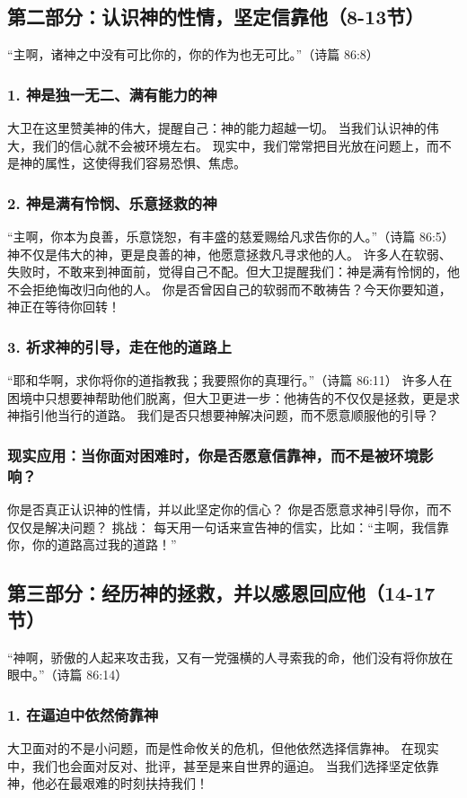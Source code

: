 \documentclass[a4paper, 12pt]{article}
\begin{document}
\subsection*{第二部分：认识神的性情，坚定信靠他（8-13节）}
“主啊，诸神之中没有可比你的，你的作为也无可比。”（诗篇 86:8）
\subsubsection*{1. 神是独一无二、满有能力的神}
大卫在这里赞美神的伟大，提醒自己：神的能力超越一切。
当我们认识神的伟大，我们的信心就不会被环境左右。
现实中，我们常常把目光放在问题上，而不是神的属性，这使得我们容易恐惧、焦虑。
\subsubsection*{2. 神是满有怜悯、乐意拯救的神}
“主啊，你本为良善，乐意饶恕，有丰盛的慈爱赐给凡求告你的人。”（诗篇 86:5）
神不仅是伟大的神，更是良善的神，他愿意拯救凡寻求他的人。
许多人在软弱、失败时，不敢来到神面前，觉得自己不配。但大卫提醒我们：神是满有怜悯的，他不会拒绝悔改归向他的人。
你是否曾因自己的软弱而不敢祷告？今天你要知道，神正在等待你回转！
\subsubsection*{3. 祈求神的引导，走在他的道路上}
“耶和华啊，求你将你的道指教我；我要照你的真理行。”（诗篇 86:11）
许多人在困境中只想要神帮助他们脱离，但大卫更进一步：他祷告的不仅仅是拯救，更是求神指引他当行的道路。
我们是否只想要神解决问题，而不愿意顺服他的引导？
\subsubsection*{现实应用：当你面对困难时，你是否愿意信靠神，而不是被环境影响？}
你是否真正认识神的性情，并以此坚定你的信心？
你是否愿意求神引导你，而不仅仅是解决问题？
挑战： 每天用一句话来宣告神的信实，比如：“主啊，我信靠你，你的道路高过我的道路！”
\subsection*{第三部分：经历神的拯救，并以感恩回应他（14-17节）}
“神啊，骄傲的人起来攻击我，又有一党强横的人寻索我的命，他们没有将你放在眼中。”（诗篇 86:14）
\subsubsection*{1. 在逼迫中依然倚靠神}
大卫面对的不是小问题，而是性命攸关的危机，但他依然选择信靠神。
在现实中，我们也会面对反对、批评，甚至是来自世界的逼迫。
当我们选择坚定依靠神，他必在最艰难的时刻扶持我们！
\end{document}
